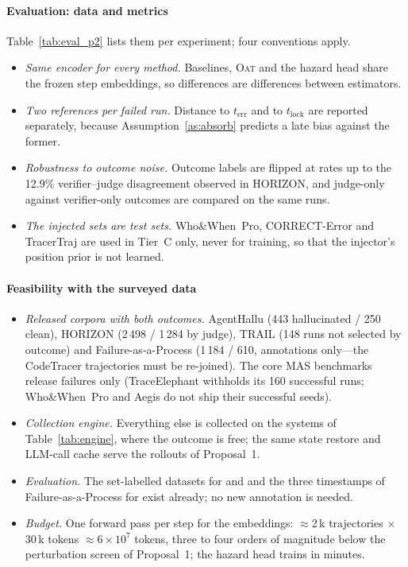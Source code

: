 \documentclass[10pt,a4paper]{article}
\begin{document}
\paragraph{Evaluation: data and metrics} Table~\ref{tab:eval_p2} lists them per experiment; four conventions apply.
\begin{itemize}[leftmargin=1.1em]
\item \emph{Same encoder for every method.} Baselines, \textsc{Oat} and the hazard head share the frozen step embeddings, so differences are differences between estimators.
\item \emph{Two references per failed run.} Distance to $t_{\mathrm{err}}$ and to $t_{\mathrm{lock}}$ are reported separately, because Assumption~\ref{as:absorb} predicts a late bias against the former.
\item \emph{Robustness to outcome noise.} Outcome labels are flipped at rates up to the 12.9\% verifier--judge disagreement observed in HORIZON, and judge-only against verifier-only outcomes are compared on the same runs.
\item \emph{The injected sets are test sets.} Who\&When~Pro, CORRECT-Error and TracerTraj are used in Tier~C only, never for training, so that the injector's position prior is not learned.
\end{itemize}

\paragraph{Feasibility with the surveyed data}
\begin{itemize}[leftmargin=1.1em]
\item \emph{Released corpora with both outcomes.} AgentHallu (443 hallucinated / 250 clean), HORIZON (2\,498 / 1\,284 by judge), TRAIL (148 runs not selected by outcome) and Failure-as-a-Process (1\,184 / 610, annotations only---the CodeTracer trajectories must be re-joined). The core MAS benchmarks release failures only (TraceElephant withholds its 160 successful runs; Who\&When~Pro and Aegis do not ship their successful seeds).
\item \emph{Collection engine.} Everything else is collected on the systems of Table~\ref{tab:engine}, where the outcome is free; the same state restore and LLM-call cache serve the rollouts of Proposal~1.
\item \emph{Evaluation.} The set-labelled datasets for  and  and the three timestamps of Failure-as-a-Process for  exist already; no new annotation is needed.
\item \emph{Budget.} One forward pass per step for the embeddings: $\approx$2\,k trajectories $\times$ 30\,k tokens $\approx6\times10^{7}$ tokens, three to four orders of magnitude below the perturbation screen of Proposal~1; the hazard head trains in minutes.
\end{itemize}
\end{document}
